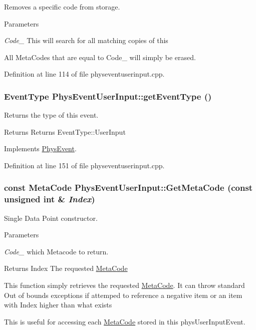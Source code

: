 Removes a specific code from storage. 
\begin{DoxyParams}{Parameters}
\item[{\em Code\_\-}]This will search for all matching copies of this\end{DoxyParams}
All MetaCodes that are equal to Code\_\- will simply be erased. 

Definition at line 114 of file physeventuserinput.cpp.\hypertarget{classPhysEventUserInput_a7adabb15e8012a86c9da1910033eea4b}{
\subsubsection[{getEventType}]{\setlength{\rightskip}{0pt plus 5cm}EventType PhysEventUserInput::getEventType ()}}
\label{dc/d0e/classPhysEventUserInput_a7adabb15e8012a86c9da1910033eea4b}


Returns the type of this event. \begin{DoxyReturn}{Returns}
Returns EventType::UserInput 
\end{DoxyReturn}


Implements \hyperlink{classPhysEvent}{PhysEvent}.

Definition at line 151 of file physeventuserinput.cpp.\hypertarget{classPhysEventUserInput_aa564530c27f6983bb412e46c2c7ed086}{
\subsubsection[{GetMetaCode}]{\setlength{\rightskip}{0pt plus 5cm}const {\bf MetaCode} PhysEventUserInput::GetMetaCode (const unsigned int \& {\em Index})}}
\label{dc/d0e/classPhysEventUserInput_aa564530c27f6983bb412e46c2c7ed086}


Single Data Point constructor. 
\begin{DoxyParams}{Parameters}
\item[{\em Code\_\-}]which Metacode to return. \end{DoxyParams}
\begin{DoxyReturn}{Returns}
Index The requested \hyperlink{classMetaCode}{MetaCode}
\end{DoxyReturn}
This function simply retrieves the requested \hyperlink{classMetaCode}{MetaCode}. It can throw standard Out of bounds exceptions if attemped to reference a negative item or an item with Index higher than what exists \par
 This is useful for accessing each \hyperlink{classMetaCode}{MetaCode} stored in this physUserInputEvent. 

